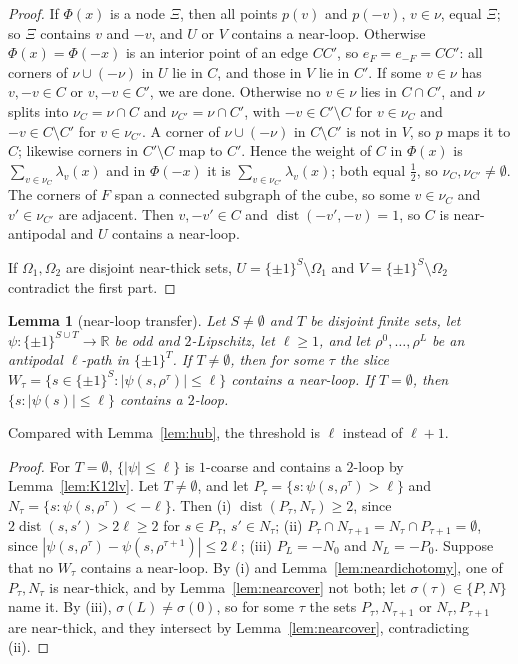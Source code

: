 \documentclass[11pt,letterpaper]{article}
\newtheorem{lemma}[theorem]{Lemma}
\theoremstyle{definition}
\newcommand{\R}{\mathbb{R}}
\newcommand{\cube}[1]{\{\pm1\}^{#1}}
\DeclareMathOperator{\dist}{dist}
\begin{document}
\begin{proof}
If $\Phi(x)$ is a node $\Xi$, then all points $p(v)$ and $p(-v)$, $v\in\nu$, equal $\Xi$; so $\Xi$
contains $v$ and $-v$, and $U$ or $V$ contains a near-loop. Otherwise $\Phi(x)=\Phi(-x)$ is an interior
point of an edge $CC'$, so $e_F=e_{-F}=CC'$: all corners of $\nu\cup(-\nu)$ in $U$ lie in $C$, and those in
$V$ lie in $C'$. If some $v\in\nu$ has $v,-v\in C$ or $v,-v\in C'$, we are done. Otherwise no $v\in\nu$ lies
in $C\cap C'$, and $\nu$ splits into $\nu_C=\nu\cap C$ and $\nu_{C'}=\nu\cap C'$, with $-v\in C'\setminus C$
for $v\in\nu_C$ and $-v\in C\setminus C'$ for $v\in\nu_{C'}$. A corner of $\nu\cup(-\nu)$ in $C\setminus C'$
is not in $V$, so $p$ maps it to $C$; likewise corners in $C'\setminus C$ map to $C'$. Hence the weight of
$C$ in $\Phi(x)$ is $\sum_{v\in\nu_C}\lambda_v(x)$ and in $\Phi(-x)$ it is $\sum_{v\in\nu_{C'}}\lambda_v(x)$;
both equal $\frac12$, so $\nu_C,\nu_{C'}\ne\emptyset$. The corners of $F$ span a connected subgraph of the
cube, so some $v\in\nu_C$ and $v'\in\nu_{C'}$ are adjacent. Then $v,-v'\in C$ and $\dist(-v',-v)=1$, so $C$
is near-antipodal and $U$ contains a near-loop.

If $\Omega_1,\Omega_2$ are disjoint near-thick sets, $U=\cube S\setminus\Omega_1$ and
$V=\cube S\setminus\Omega_2$ contradict the first part.
\end{proof}

\begin{lemma}[near-loop transfer]\label{lem:neartransfer}
Let $S\ne\emptyset$ and $T$ be disjoint finite sets, let $\psi\colon\cube{S\cup T}\to\R$ be odd and
$2$-Lipschitz, let $\ell\ge1$, and let $\rho^0,\dots,\rho^L$ be an antipodal $\ell$-path in $\cube T$.
If $T\ne\emptyset$, then for some $\tau$ the slice $W_\tau=\{s\in\cube S:|\psi(s,\rho^\tau)|\le\ell\}$
contains a near-loop. If $T=\emptyset$, then $\{s:|\psi(s)|\le\ell\}$ contains a $2$-loop.
\end{lemma}

Compared with Lemma~\ref{lem:hub}, the threshold is $\ell$ instead of $\ell+1$.

\begin{proof}
For $T=\emptyset$, $\{|\psi|\le\ell\}$ is $1$-coarse and contains a $2$-loop by Lemma~\ref{lem:K12lv}. Let
$T\neq\emptyset$, and let $P_\tau=\{s:\psi(s,\rho^\tau)>\ell\}$ and $N_\tau=\{s:\psi(s,\rho^\tau)<-\ell\}$.
Then (i) $\dist(P_\tau,N_\tau)\ge2$, since $2\dist(s,s')>2\ell\ge2$ for $s\in P_\tau$, $s'\in N_\tau$;
(ii) $P_\tau\cap N_{\tau+1}=N_\tau\cap P_{\tau+1}=\emptyset$, since
$|\psi(s,\rho^\tau)-\psi(s,\rho^{\tau+1})|\le2\ell$; (iii) $P_L=-N_0$ and $N_L=-P_0$. Suppose that no
$W_\tau$ contains a near-loop. By (i) and Lemma~\ref{lem:neardichotomy}, one of $P_\tau,N_\tau$ is
near-thick, and by Lemma~\ref{lem:nearcover} not both; let $\sigma(\tau)\in\{P,N\}$ name it. By (iii),
$\sigma(L)\ne\sigma(0)$, so for some $\tau$ the sets $P_\tau,N_{\tau+1}$ or $N_\tau,P_{\tau+1}$ are
near-thick, and they intersect by Lemma~\ref{lem:nearcover}, contradicting (ii).
\end{proof}
\end{document}
